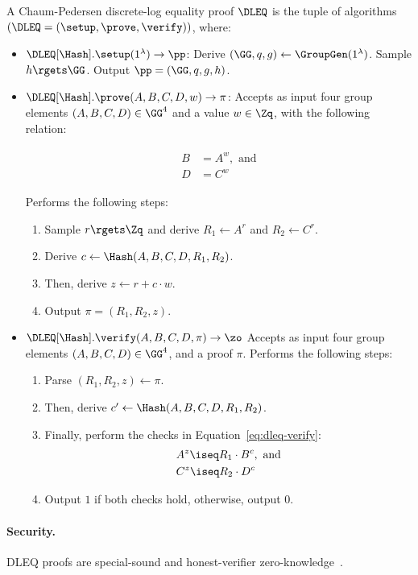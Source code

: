\begin{definition}
A Chaum-Pedersen discrete-log equality proof $\DLEQ$ is the tuple of algorithms
  $(\DLEQ = (\setup, \prove, \verify))$,
where:

\begin{itemize}
  \item $\DLEQ[\Hash].\setup(1^\lambda) \rightarrow \pp$:
Derive $(\GG, q, g) \gets \GroupGen(1^\lambda)$.
Sample $h \rgets \GG$.
Output $\pp = (\GG, q, g, h)$.
  \item $\DLEQ[\Hash].\prove(A, B, C, D, w) \rightarrow \pi$:
Accepts as input four group elements $(A, B, C, D) \in \GG^4$ and a value $w \in \Zq$,
with the following relation:

    \begin{align}
      \begin{split}
        B &= A^w, \text{ and} \\
        D &= C^w
      \end{split}
    \end{align}

Performs the following steps:
\begin{enumerate}
\item Sample $r \rgets \Zq$ and derive $R_1 \gets A^r$ and $R_2 \gets C^r$.
\item Derive $c \gets \Hash(A, B, C, D, R_1, R_2)$.
\item Then, derive $z \gets r + c \cdot w$.
\item Output $\pi = (R_1, R_2, z)$.
\end{enumerate}
\item $\DLEQ[\Hash].\verify(A, B, C, D, \pi) \rightarrow \zo$
Accepts as input four group elements $(A, B, C, D) \in \GG^4$,
and a proof $\pi$.
Performs the following steps:
\begin{enumerate}
\item Parse $(R_1, R_2, z) \gets \pi$.
\item Then, derive $c' \gets \Hash(A, B, C, D, R_1, R_2)$.
\item Finally, perform the checks in Equation~\ref{eq:dleq-verify}:
  \begin{align} \label{eq:dleq-verify}
\begin{split}
  & A^z \iseq R_1 \cdot B^c, \text{ and} \\
  & C^z \iseq R_2 \cdot D^c
\end{split}
\end{align}
\item Output $1$ if both checks hold, otherwise, output $0$.
\end{enumerate}
\end{itemize}
\end{definition}

\paragraph{Security.}
DLEQ proofs are special-sound and honest-verifier zero-knowledge~\cite{BonehS2020}.


